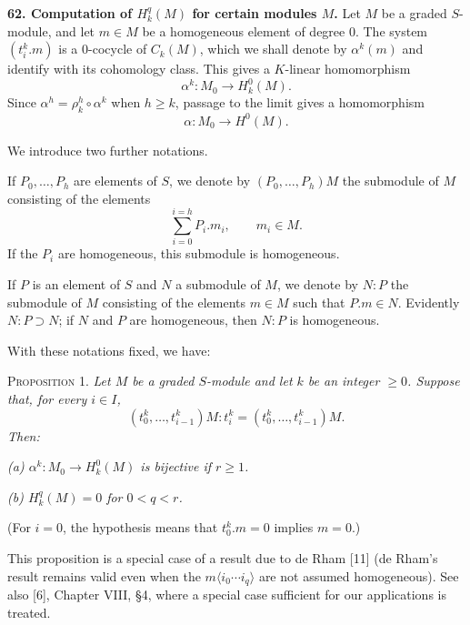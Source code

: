 
\label{fac:III:3:no:62}
\textbf{62. Computation of $H^q_k(M)$ for certain modules $M$.}
Let $M$ be a graded $S$-module, and let $m\in M$ be a homogeneous
element of degree $0$. The system $(t_i^k.m)$ is a $0$-cocycle of
$C_k(M)$, which we shall denote by $\alpha^k(m)$ and identify with its
cohomology class. This gives a $K$-linear homomorphism
\label{fac:III:3:no:62:def:alpha-k}
\[
\alpha^k:M_0\longrightarrow H^0_k(M).
\]
Since $\alpha^h=\rho^h_k\circ\alpha^k$ when $h\geq k$, passage to the
limit gives a homomorphism
\label{fac:III:3:no:62:def:alpha}
\[
\alpha:M_0\longrightarrow H^0(M).
\]

We introduce two further notations.

\label{fac:III:3:no:62:def:generated-submodule}
If $P_0,\ldots,P_h$ are elements of $S$, we denote by
$(P_0,\ldots,P_h)M$ the submodule of $M$ consisting of the elements
\[
\sum_{i=0}^{i=h}P_i.m_i,\qquad m_i\in M.
\]
If the $P_i$ are homogeneous, this submodule is homogeneous.

\label{fac:III:3:no:62:def:colon-submodule}
If $P$ is an element of $S$ and $N$ a submodule of $M$, we denote by
$N:P$ the submodule of $M$ consisting of the elements $m\in M$ such
that $P.m\in N$. Evidently $N:P\supset N$; if $N$ and $P$ are
homogeneous, then $N:P$ is homogeneous.

With these notations fixed, we have:

\label{fac:III:3:no:62:prop:1}
\textsc{Proposition 1.} \textit{Let $M$ be a graded $S$-module and let
$k$ be an integer $\geq0$. Suppose that, for every $i\in I$,}
\label{fac:III:3:no:62:prop:1:hypothesis}
\[
(t_0^k,\ldots,t_{i-1}^k)M:t_i^k
=(t_0^k,\ldots,t_{i-1}^k)M.
\]
\textit{Then:}

\label{fac:III:3:no:62:prop:1:item:a}
\textit{(a) $\alpha^k:M_0\to H_k^0(M)$ is bijective if $r\geq1$.}

\label{fac:III:3:no:62:prop:1:item:b}
\textit{(b) $H_k^q(M)=0$ for $0<q<r$.}

(For $i=0$, the hypothesis means that $t_0^k.m=0$ implies $m=0$.)

This proposition is a special case of a result due to de Rham [11]
(de Rham's result remains valid even when the
$m\langle i_0\cdots i_q\rangle$ are not assumed homogeneous). See also
[6], Chapter VIII, \S4, where a special case sufficient for our
applications is treated.

